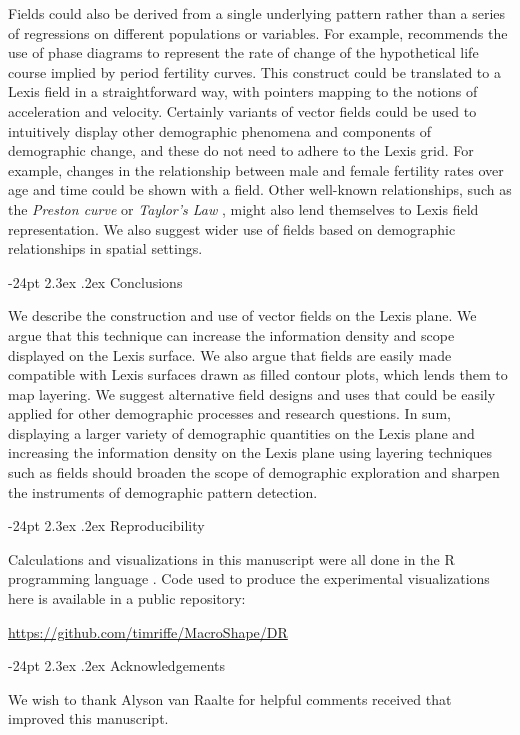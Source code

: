 \documentclass[10pt, twoside, parskip=half]{article}
\makeatletter
\renewcommand\section{\@startsection {section}{1}{\z@}%
                                   {-24pt}%
                                   {2.3ex \@plus.2ex}%
                                   {\normalfont\large\bfseries}}
\makeatother
\begin{document}
Fields could also be derived from a single underlying pattern rather than a series of regressions on different populations or variables. For example, \citet{shang2018visualizing} recommends the use of phase diagrams to represent the rate of change of the hypothetical life course implied by period fertility curves. This construct could be translated to a Lexis field in a straightforward way, with pointers mapping to the notions of acceleration and velocity. Certainly variants of vector fields could be used to intuitively display other demographic phenomena and components of demographic change, and these do not need to adhere to the Lexis grid. For example, changes in the relationship between male and female fertility rates over age and time could be shown with a field. Other well-known relationships, such as the \emph{Preston curve} \citep{preston1975changing} or \emph{Taylor's Law} \citep{cohen2018gompertz}, might also lend themselves to Lexis field representation. We also suggest wider use of fields based on demographic relationships in spatial settings.

\hypertarget{conclusions}{%
\section{Conclusions}\label{conclusions}}

We describe the construction and use of vector fields on the Lexis plane. We argue that this technique can increase the information density and scope displayed on the Lexis surface. We also argue that fields are easily made compatible with Lexis surfaces drawn as filled contour plots, which lends them to map layering. We suggest alternative field designs and uses that could be easily applied for other demographic processes and research questions. In sum, displaying a larger variety of demographic quantities on the Lexis plane and increasing the information density on the Lexis plane using layering techniques such as fields should broaden the scope of demographic exploration and sharpen the instruments of demographic pattern detection.

\hypertarget{reproducibility}{%
\section{Reproducibility}\label{reproducibility}}

Calculations and visualizations in this manuscript were all done in the R programming language \citep{R}. Code used to produce the experimental visualizations here is available in a public repository:

\url{https://github.com/timriffe/MacroShape/DR}

\hypertarget{acknowledgements}{%
\section{Acknowledgements}\label{acknowledgements}}

We wish to thank Alyson van Raalte for helpful comments received that improved this manuscript.

\clearpage

\newpage


\end{document}
